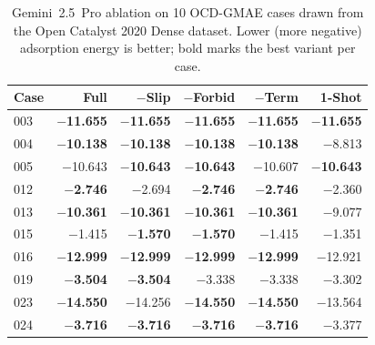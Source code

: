 
\begin{table}[t]
\centering
\small
\caption{Gemini~2.5~Pro ablation on 10 OCD-GMAE cases drawn from the Open Catalyst 2020 Dense dataset. Lower (more negative) adsorption energy is better; bold marks the best variant per case.}
\label{tab:ocd-ablation-gemini}
\begin{tabular}{lrrrrr}
\toprule
Case & Full & $-$Slip & $-$Forbid & $-$Term & 1-Shot \\
\midrule
003 & \textbf{$-$11.655} & \textbf{$-$11.655} & \textbf{$-$11.655} & \textbf{$-$11.655} & \textbf{$-$11.655} \\
004 & \textbf{$-$10.138} & \textbf{$-$10.138} & \textbf{$-$10.138} & \textbf{$-$10.138} & $-$8.813 \\
005 & $-$10.643 & \textbf{$-$10.643} & \textbf{$-$10.643} & $-$10.607 & \textbf{$-$10.643} \\
012 & \textbf{$-$2.746} & $-$2.694 & \textbf{$-$2.746} & \textbf{$-$2.746} & $-$2.360 \\
013 & \textbf{$-$10.361} & \textbf{$-$10.361} & \textbf{$-$10.361} & \textbf{$-$10.361} & $-$9.077 \\
015 & $-$1.415 & \textbf{$-$1.570} & \textbf{$-$1.570} & $-$1.415 & $-$1.351 \\
016 & \textbf{$-$12.999} & \textbf{$-$12.999} & \textbf{$-$12.999} & \textbf{$-$12.999} & $-$12.921 \\
019 & \textbf{$-$3.504} & \textbf{$-$3.504} & $-$3.338 & $-$3.338 & $-$3.302 \\
023 & \textbf{$-$14.550} & $-$14.256 & \textbf{$-$14.550} & \textbf{$-$14.550} & $-$13.564 \\
024 & \textbf{$-$3.716} & \textbf{$-$3.716} & \textbf{$-$3.716} & \textbf{$-$3.716} & $-$3.377 \\
\bottomrule
\end{tabular}
\end{table}

